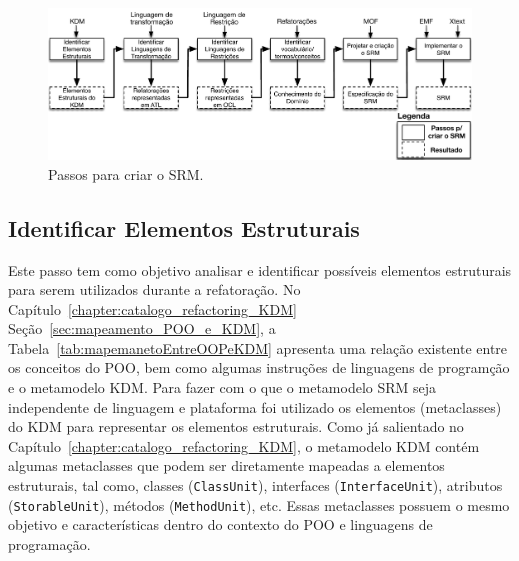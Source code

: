 \begin{figure}[h]
	\centering
	\caption{Passos para criar o SRM.}
	\label{fig:etapas_da_fase_de_e_do_SRM}
	\includegraphics[scale=0.65]{images/abordagem_criar_SRM}
	\fautor
\end{figure}



\subsection{Identificar Elementos Estruturais}

Este passo tem como objetivo analisar e identificar possíveis elementos estruturais para serem utilizados durante a refatoração. No Capítulo~\ref{chapter:catalogo_refactoring_KDM} Seção~\ref{sec:mapeamento_POO_e_KDM}, a Tabela~\ref{tab:mapemanetoEntreOOPeKDM} apresenta uma relação existente entre os conceitos do POO, bem como algumas instruções de linguagens de programção e o metamodelo KDM. Para fazer com o que o metamodelo SRM seja independente de linguagem e plataforma foi utilizado os elementos (metaclasses) do KDM para representar os elementos estruturais. Como já salientado no Capítulo~\ref{chapter:catalogo_refactoring_KDM}, o metamodelo KDM contém algumas metaclasses que podem ser diretamente mapeadas a elementos estruturais, tal como, classes (\texttt{ClassUnit}), interfaces (\texttt{InterfaceUnit}), atributos (\texttt{StorableUnit}), métodos (\texttt{MethodUnit}), etc. Essas metaclasses possuem o mesmo objetivo e características dentro do contexto do POO e linguagens de programação. %

